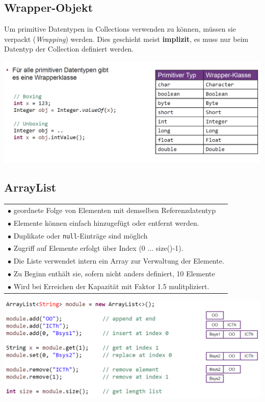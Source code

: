 {\subsection{Wrapper-Objekt}
    Um primitive Datentypen in Collections verwenden zu können, müssen sie verpackt (\textit{Wrapping}) werden. Dies geschieht
    meist \textbf{implizit}, es muss nur beim Datentyp der Collection definiert werden.\\
    \vspace{-0.3cm}
    \begin{center}
        \includegraphics[width=0.85\columnwidth]{pictures/wrapper-klassen.png}
    \end{center}
    \vspace{-0.5cm}

\subsection{ArrayList}
    \begin{tabular}{l}
        $\bullet$ geordnete Folge von Elementen mit demselben Referenzdatentyp\\
        $\bullet$ Elemente können einfach hinzugefügt oder entfernt werden.\\
        $\bullet$ Duplikate oder \verb|null|-Einträge sind möglich\\
        $\bullet$ Zugriff auf Elemente erfolgt über Index (0 ... size()-1).\\
        $\bullet$ Die Liste verwendet intern ein Array zur Verwaltung der Elemente.\\
        $\bullet$ Zu Beginn enthält sie, sofern nicht anders definiert, 10 Elemente\\
        $\bullet$ Wird bei Erreichen der Kapazität mit Faktor 1.5 mulitpliziert.\\
    \end{tabular}

    \vspace{-0.1cm}
    \begin{center}
        \includegraphics[width=0.78\columnwidth]{pictures/arrayList-bsp.png}
    \end{center}
    \vspace{-0.1cm}

}
